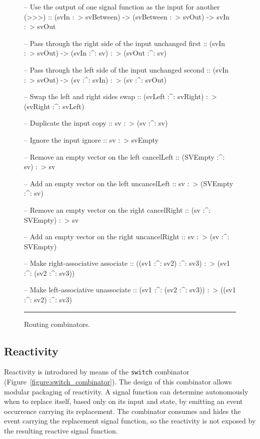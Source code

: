 \begin{figure}
\begin{code}
-- Use the output of one signal function as the input for another
(>>>) :: (svIn :~> svBetween) -> (svBetween :~> svOut) -> svIn :~> svOut

-- Pass through the right side of the input unchanged
first :: (svIn :~> svOut) -> (svIn :^: sv) :~> (svOut :^: sv)

-- Pass through the left side of the input unchanged
second :: (svIn :~> svOut) -> (sv :^: svIn) :~> (sv :^: svOut)

-- Swap the left and right sides
swap :: (svLeft :^: svRight) :~> (svRight :^: svLeft)

-- Duplicate the input
copy :: sv :~> (sv :^: sv)

-- Ignore the input
ignore :: sv :~> svEmpty

-- Remove an empty vector on the left
cancelLeft :: (SVEmpty :^: sv) :~> sv

-- Add an empty vector on the left
uncancelLeft :: sv :~> (SVEmpty :^: sv)

-- Remove an empty vector on the right
cancelRight :: (sv :^: SVEmpty) :~> sv

-- Add an empty vector on the right
uncancelRight :: sv :~> (sv :^: SVEmpty)

-- Make right-associative
associate :: ((sv1 :^: sv2) :^: sv3) :~> (sv1 :^: (sv2 :^: sv3))

-- Make left-associative
unassociate :: (sv1 :^: (sv2 :^: sv3)) :~> ((sv1 :^: sv2) :^: sv3)
\end{code}
\hrule
\caption{Routing combinators.}
\label{figure:routing_combinators}
\end{figure}

\subsection{Reactivity}
\label{subsection:System_Design_and_Interface-Combinators-Reactivity}

Reactivity is introduced by means of the {\tt switch} combinator
(Figure~\ref{figure:switch_combinator}). The design of this combinator
allows modular packaging of reactivity. A signal function can determine
autonomously when to replace itself, based only on its input and state,
by emitting an event occurrence carrying its replacement. The combinator
consumes and hides the event carrying the replacement signal function, 
so the reactivity is not exposed by the resulting reactive signal function.

